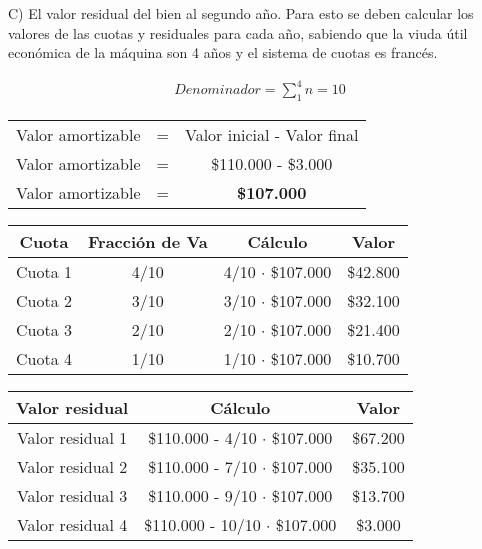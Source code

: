 \documentclass[12pt,a4paper]{article}
\begin{document}
        \hrulefill
        
        C) El valor residual del bien al segundo año. Para esto se deben calcular los valores de las cuotas y residuales para cada año, sabiendo que la viuda útil económica de la máquina son 4 años y el sistema de cuotas es francés.
        
        \begin{align*}
        	Denominador = \sum_{1}^{4} n = 10
		\end{align*}
        
		\begin{table}[H]
		\centering
        	\begin{tabular}{ c c c }
            	Valor amortizable	&=&		Valor inicial - Valor final \\
                Valor amortizable	&=&		\$110.000 - \$3.000 \\
                Valor amortizable	&=&		\textbf{\$107.000}
			\end{tabular}
		\end{table}
        
        \newpage
        
        \begin{table}[H]
        \centering
        	\begin{tabular}{ | c | c | c | c | }
            	\hline
                Cuota	&	Fracción de Va	&	Cálculo					&	Valor		\\ \hline
                Cuota 1	&	4/10			&	4/10 $\cdot$ \$107.000	&	\$42.800	\\ \hline
                Cuota 2	&	3/10			&	3/10 $\cdot$ \$107.000	&	\$32.100	\\ \hline
                Cuota 3	&	2/10			&	2/10 $\cdot$ \$107.000	&	\$21.400	\\ \hline
                Cuota 4	&	1/10			&	1/10 $\cdot$ \$107.000	&	\$10.700	\\ \hline
			\end{tabular}
		\end{table}
        
        \begin{table}[H]
        \centering
        	\begin{tabular}{ | c | c | c | }
            	\hline
                Valor residual		&	Cálculo								&	Valor		\\ \hline
                Valor residual 1	&	\$110.000 - 4/10 $\cdot$ \$107.000	&	\$67.200	\\ \hline
                Valor residual 2	&	\$110.000 - 7/10 $\cdot$ \$107.000	&	\$35.100	\\ \hline
                Valor residual 3	&	\$110.000 - 9/10 $\cdot$ \$107.000	&	\$13.700	\\ \hline
                Valor residual 4	&	\$110.000 - 10/10 $\cdot$ \$107.000	&	\$3.000		\\ \hline
			\end{tabular}
		\end{table}
        
\end{document}
